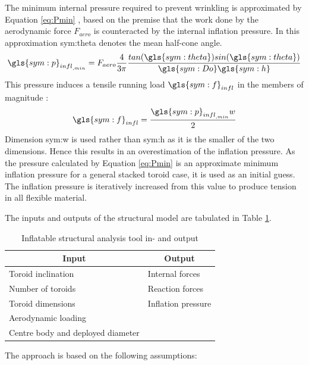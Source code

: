 The minimum internal pressure required to prevent wrinkling is approximated by Equation \ref{eq:Pmin} \cite{Brown2009, Samareh2011}, based on the premise that the work done by the aerodynamic force $F_{aero}$ is counteracted by the internal inflation pressure. In this approximation \gls{sym:theta} denotes the mean half-cone angle.
\begin{equation}
\label{eq:Pmin}
\gls{sym:p}_{{infl}_{,min}} = F_{aero} \frac{4}{3 \pi} \frac{tan(\gls{sym:theta})sin(\gls{sym:theta}) }{\gls{sym:Do}\gls{sym:h}}
\end{equation}
This pressure induces a tensile running load $\gls{sym:f}_{infl}$ in the members of magnitude \cite{Megson2012}:
\begin{equation}
\label{eq:Q}
\gls{sym:f}_{infl} =\frac{\gls{sym:p}_{{infl}_{,min}}w}{2}
\end{equation}
Dimension \gls{sym:w} is used rather than \gls{sym:h} as it is the smaller of the two dimensions. Hence this results in an overestimation of the inflation pressure. As the pressure calculated by Equation \ref{eq:Pmin} is an approximate minimum inflation pressure for a general stacked toroid case, it is used as an initial guess. The inflation pressure is iteratively increased from this value to produce tension in all flexible material.

The inputs and outputs of the structural model are tabulated in Table \ref{tab:infl}.
\begin{table}[h]
\caption{Inflatable structural analysis tool in- and output}
\centering
\begin{tabular}{|l||l|}
\hline
\multicolumn{1}{|c||}{{\bf Input}} & \multicolumn{1}{c|}{{\bf Output}} \\ \hline \hline
Toroid inclination                & Internal forces                   \\ \hline
Number of toroids                 & Reaction forces                   \\ \hline
Toroid dimensions                 & Inflation pressure                \\ \hline
Aerodynamic loading               &                                   \\ \hline
Centre body and deployed diameter  &                                   \\ \hline
\end{tabular}
\label{tab:infl}
\end{table}

The approach is based on the following assumptions:

